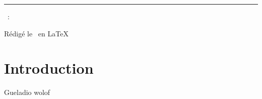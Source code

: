 \documentclass[a4paper,french,10pt]{article}
\begin{document}
	
	\title{\vspace{-1in}} %
	\author{} %
	\date{} %
	\maketitle %
	
	\usebox{\myReportTitle}
	\vspace{1in} %
	
	{\centering \huge \assignmentName \par}
	{\centering \noindent\rule{4in}{0.1pt} \par}
	\vspace{0.05in}
	{\centering \courseCode~: \courseName~ \par}
	{\centering Rédigé le \pubDate\ en \LaTeX \par}
	\vspace{1in}
	
	\tableofcontents
	\newpage
	
	
\section{Introduction}
Gueladio wolof	

%


\end{document}
